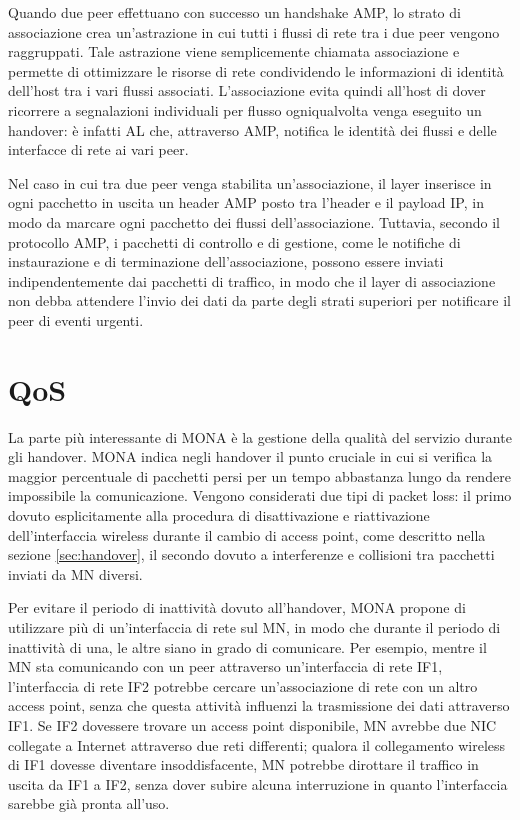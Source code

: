 \documentclass[12pt,a4paper,openright,twoside,draft]{book}
\begin{document}
Quando due peer effettuano con successo un handshake AMP, lo strato di
associazione crea un'astrazione in cui tutti i flussi di rete tra i
due peer vengono raggruppati. Tale astrazione viene semplicemente
chiamata associazione e permette di ottimizzare le risorse di rete
condividendo le informazioni di identità dell'host tra i vari flussi
associati. L'associazione evita quindi all'host di dover ricorrere a
segnalazioni individuali per flusso ogniqualvolta venga eseguito un
handover: è infatti AL che, attraverso AMP, notifica le identità dei
flussi e delle interfacce di rete ai vari peer.

Nel caso in cui tra due peer venga stabilita un'associazione, il layer
inserisce in ogni pacchetto in uscita un header AMP posto tra l'header
e il payload IP, in modo da marcare ogni pacchetto dei flussi
dell'associazione. Tuttavia, secondo il protocollo AMP, i pacchetti di
controllo e di gestione, come le notifiche di instaurazione e di
terminazione dell'associazione, possono essere inviati
indipendentemente dai pacchetti di traffico, in modo che il layer di
associazione non debba attendere l'invio dei dati da parte degli
strati superiori per notificare il peer di eventi urgenti.

\section{QoS}
\label{sec:mona:qos}

La parte più interessante di MONA è la gestione della qualità del
servizio durante gli handover. MONA indica negli handover il punto
cruciale in cui si verifica la maggior percentuale di pacchetti persi
per un tempo abbastanza lungo da rendere impossibile la
comunicazione. Vengono considerati due tipi di packet loss: il primo
dovuto esplicitamente alla procedura di disattivazione e riattivazione
dell'interfaccia wireless durante il cambio di access point, come
descritto nella sezione \ref{sec:handover}, il secondo dovuto a
interferenze e collisioni tra pacchetti inviati da MN diversi.

Per evitare il periodo di inattività dovuto all'handover, MONA propone
di utilizzare più di un'interfaccia di rete sul MN, in modo che
durante il periodo di inattività di una, le altre siano in grado di
comunicare. Per esempio, mentre il MN sta comunicando con un peer
attraverso un'interfaccia di rete IF1, l'interfaccia di rete IF2
potrebbe cercare un'associazione di rete con un altro access point,
senza che questa attività influenzi la trasmissione dei dati
attraverso IF1. Se IF2 dovessere trovare un access point disponibile,
MN avrebbe due NIC collegate a Internet attraverso due reti
differenti; qualora il collegamento wireless di IF1 dovesse diventare
insoddisfacente, MN potrebbe dirottare il traffico in uscita da IF1 a
IF2, senza dover subire alcuna interruzione in quanto l'interfaccia
sarebbe già pronta all'uso.
\end{document}
